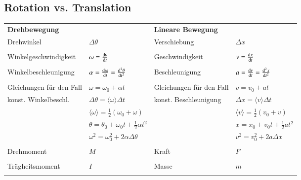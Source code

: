 	\subsection{Rotation vs. Translation}
		\begin{center}
			\begin{adjustbox}{angle=90}
				\begin{tabular}{llll}
					\textbf{Drehbewegung}       & & \textbf{Lineare Bewegung} \\
					Drehwinkel					& $ \Delta \theta $ & Verschiebung																& $ \Delta x $ \\
					&&&\\
					Winkelgeschwindigkeit		& $ \omega = \frac{\mathop{} \! \mathrm{d} \theta}{\mathop{} \! \mathrm{d} t} $ & Geschwindigkeit									& $ v = \frac{\mathop{} \! \mathrm{d} x}{\mathop{} \! \mathrm{d} t} $ \\
					&&&\\
					Winkelbeschleunigung		& $ \alpha = \frac{\mathop{} \! \mathrm{d} \omega}{\mathop{} \! \mathrm{d} t} = \frac{\mathop{} \! \mathrm{d}^2 \theta}{\mathop{} \! \mathrm{d} t^2} $ & Beschleunigung	& $ a = \frac{\mathop{} \! \mathrm{d} v}{\mathop{} \! \mathrm{d} t} = \frac{\mathop{} \! \mathrm{d}^2 x}{\mathop{} \! \mathrm{d} t^2} $ \\
					&&&\\
					Gleichungen für den Fall	& $ \omega = \omega_0 + \alpha t $ & Gleichungen für den Fall									& $ v = v_0 + a t $ \\
					konst. Winkelbeschl.		& $ \Delta \theta = \langle \omega \rangle \Delta t $ & konst. Beschleunigung					& $ \Delta x = \langle v \rangle \Delta t $ \\
												& $ \langle \omega \rangle = \frac{1}{2} (\omega_0 + \omega) $ & 								& $ \langle v \rangle = \frac{1}{2} (v_0 + v) $ \\
												& $ \theta = \theta_0 + \omega_0 t + \frac{1}{2} \alpha t^2 $ & 								& $ x = x_0 + v_0 t + \frac{1}{2}a t^2 $ \\
												& $ \omega^2 = \omega_0^2 + 2 \alpha \Delta \theta $ & 											& $ v^2 = v_0^2 + 2a \Delta x $ \\
												&&&\\
					Drehmoment					& $ M $ & Kraft																					& $ F $ \\
					&&&\\
					Trägheitsmoment				& $ I $ & Masse																					& $ m $ \\
					&&&\\

\end{tabular}
\end{adjustbox}
\end{center}
